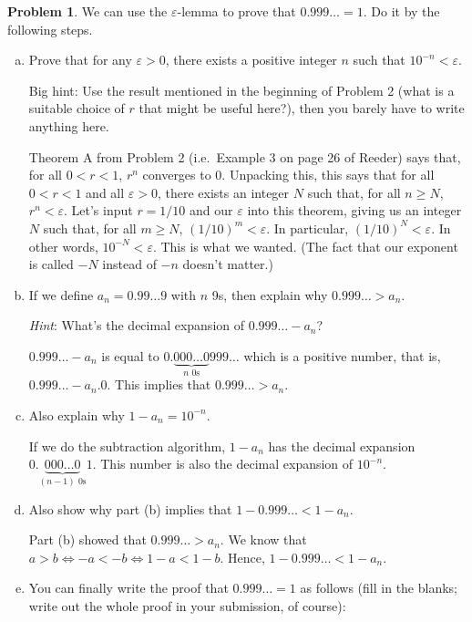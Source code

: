 \documentclass[11pt,oneside]{amsart}
\theoremstyle{definition}
\newtheorem{problem}{Problem}
\theoremstyle{plain}
\newcommand{\eps}{\varepsilon}
\begin{document}
    \begin{problem}
        We can use the $\eps$-lemma to prove that $0.999\ldots=1$. Do it by the following steps.
        \begin{enumerate}[(a)]
            \item Prove that for any $\eps>0$, there exists a positive integer $n$ such that $10^{-n}<\eps$.
            
            Big hint: Use the result mentioned in the beginning of Problem 2 (what is a suitable choice of $r$ that might be useful here?), then you barely have to write anything here.
            \begin{solution}
                Theorem A from Problem 2 (i.e.\ Example 3 on page 26 of Reeder) says that, for all $0<r<1$, $r^n$ converges to 0. Unpacking this, this says that for all $0<r<1$ and all $\eps>0$, there exists an integer $N$ such that, for all $n\geq N$, $r^n<\eps$. Let's input $r=1/10$ and our $\eps$ into this theorem, giving us an integer $N$ such that, for all $m\geq N$, $(1/10)^m<\eps$. In particular, $(1/10)^N<\eps$. In other words, $10^{-N}<\eps$. This is what we wanted. (The fact that our exponent is called $-N$ instead of $-n$ doesn't matter.)
            \end{solution}
            \item If we define $a_n=0.99\dots 9$ with $n$ 9s, then explain why $0.999\ldots >a_n$.
            
            \emph{Hint}: What's the decimal expansion of $0.999\ldots-a_n$?
            \begin{solution}
                $0.999\ldots-a_n$ is equal to $0.\underbrace{000\ldots 0}_{n\text{ 0s}}999\ldots$ which is a positive number, that is, $0.999\ldots-a_n.0$. This implies that $0.999\ldots>a_n$.
            \end{solution}
            \item Also explain why $1-a_n=10^{-n}$.
            \begin{solution}
                If we do the subtraction algorithm, $1-a_n$ has the decimal expansion $0.\underbrace{000\ldots 0}_{(n-1)\text{ 0s}}1$. This number is also the decimal expansion of $10^{-n}$.
            \end{solution}
            \item Also show why part (b) implies that $1-0.999\ldots<1-a_n$.
            \begin{solution}
                Part (b) showed that $0.999\ldots >a_n$. We know that $a>b\iff -a<-b\iff 1-a<1-b$. Hence, $1-0.999\ldots<1-a_n$.
            \end{solution}
            \item You can finally write the proof that $0.999\ldots=1$ as follows (fill in the blanks; write out the whole proof in your submission, of course):
            

\end{enumerate}
\end{problem}
\end{document}
